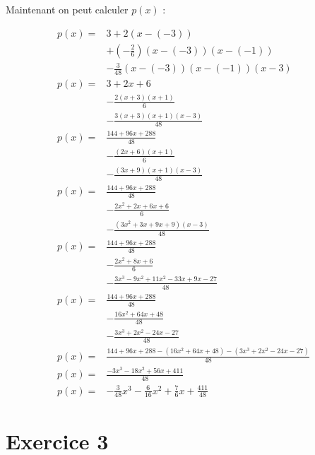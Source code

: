 \documentclass[12pt, letterpaper]{article}
\begin{document}
Maintenant on peut calculer $p(x)$ :

\begin{equation*}
\begin{split}
  p(x) = & 3 + 2(x - (-3)) \\
         & + (-\frac{2}{6})(x - (-3))(x - (-1)) \\
         & -\frac{3}{48}(x - (-3))(x - (-1))(x - 3) \\
  p(x) = & 3 + 2x + 6 \\
         & -\frac{2(x + 3)(x + 1)}{6} \\
         & -\frac{3(x + 3)(x + 1)(x - 3)}{48} \\
  p(x) = & \frac{144 + 96x + 288}{48} \\
         & -\frac{(2x + 6)(x + 1)}{6} \\
         & -\frac{(3x + 9)(x + 1)(x - 3)}{48} \\
  p(x) = & \frac{144 + 96x + 288}{48} \\
         & -\frac{2x^2 + 2x + 6x + 6}{6} \\
         & -\frac{(3x^2 + 3x + 9x + 9)(x - 3)}{48} \\
  p(x) = & \frac{144 + 96x + 288}{48} \\
         & -\frac{2x^2 + 8x + 6}{6} \\
         & -\frac{3x^3 - 9x^2 + 11x^2 - 33x + 9x - 27}{48} \\
  p(x) = & \frac{144 + 96x + 288}{48} \\
         & -\frac{16x^2 + 64x + 48}{48} \\
         & -\frac{3x^3 + 2x^2 - 24x - 27}{48} \\
  p(x) = & \frac{144 + 96x + 288 - (16x^2 + 64x + 48) - (3x^3 + 2x^2 -
    24x - 27)}{48} \\
  p(x) = &  \frac{-3x^3 - 18x^2 + 56x + 411}{48} \\
  p(x) = & -\frac{3}{48}x^3 - \frac{6}{16}x^2 + \frac{7}{6}x +
  \frac{411}{48}
\end{split}
\end{equation*}

\section*{Exercice 3}
\end{document}
